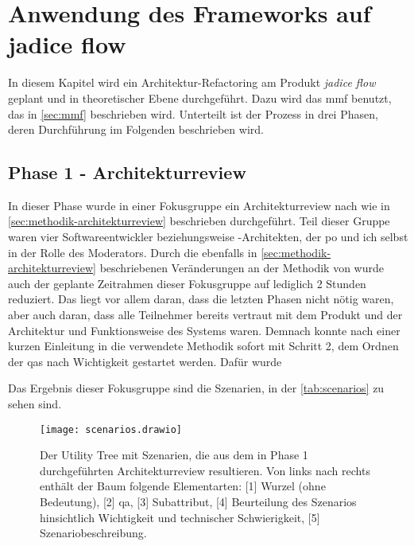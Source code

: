 \chapter{Anwendung des Frameworks auf jadice flow}
\label{chap:anwendung}

In diesem Kapitel wird ein Architektur-Refactoring am Produkt \emph{jadice flow} geplant und in theoretischer Ebene durchgeführt.
Dazu wird das \gls{mmf} benutzt, das in \cref{sec:mmf} beschrieben wird.
Unterteilt ist der Prozess in drei Phasen, deren Durchführung im Folgenden beschrieben wird.

\section{Phase 1 - Architekturreview}

In dieser Phase wurde in einer Fokusgruppe ein Architekturreview nach  wie in \cref{sec:methodik-architekturreview} beschrieben durchgeführt.
Teil dieser Gruppe waren vier Softwareentwickler beziehungsweise -Architekten, der \acrlong{po} und ich selbst in der Rolle des Moderators.
Durch die ebenfalls in \cref{sec:methodik-architekturreview} beschriebenen Veränderungen an der Methodik von  wurde auch der geplante Zeitrahmen dieser Fokusgruppe auf lediglich 2 Stunden reduziert. Das liegt vor allem daran, dass die letzten Phasen nicht nötig waren, aber auch daran, dass alle Teilnehmer bereits vertraut mit dem Produkt und der Architektur und Funktionsweise des Systems waren. 
Demnach konnte nach einer kurzen Einleitung in die verwendete Methodik sofort mit Schritt 2, dem Ordnen der \glspl{qa} nach Wichtigkeit gestartet werden.
Dafür wurde 

Das Ergebnis dieser Fokusgruppe sind die Szenarien, in der \cref{tab:scenarios} zu sehen sind.

\begin{landscape}
	\begin{figure}
		\centering
		\texttt{[image: scenarios.drawio]}
		\caption[Utility Tree mit im Architekturreview ermittelten Qualitätsanforderungen und Szenarien]{
			Der Utility Tree mit Szenarien, die aus dem in Phase 1 durchgeführten Architekturreview resultieren.
			Von links nach rechts enthält der Baum folgende Elementarten: [1] Wurzel (ohne Bedeutung), [2] \gls{qa}, [3] Subattribut, [4] Beurteilung des Szenarios hinsichtlich Wichtigkeit und technischer Schwierigkeit, [5] Szenariobeschreibung.
		}
		\label{fig:scenarios}
	\end{figure}
\end{landscape}

